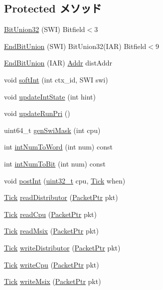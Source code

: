 \subsection*{Protected メソッド}
\begin{DoxyCompactItemize}
\item 
\hyperlink{classPl390_aa9b0863223c08e95ba11ad9fce05f3fe}{BitUnion32} (SWI) Bitfield$<$3
\item 
\hyperlink{classPl390_a094c748f681520d1c676cc22f9542515}{EndBitUnion} (SWI) BitUnion32(IAR) Bitfield$<$9
\item 
\hyperlink{classPl390_af3e922c98e5df31ce49f179286cf9d48}{EndBitUnion} (IAR) \hyperlink{base_2types_8hh_af1bb03d6a4ee096394a6749f0a169232}{Addr} distAddr
\item 
void \hyperlink{classPl390_a682f28e23fc12360ec124caecc0247dd}{softInt} (int ctx\_\-id, SWI swi)
\item 
void \hyperlink{classPl390_affe49b35938d140039c9e4f8aac94409}{updateIntState} (int hint)
\item 
void \hyperlink{classPl390_a036668b76c53cab82ed983b838667b23}{updateRunPri} ()
\item 
uint64\_\-t \hyperlink{classPl390_a049810caa3741b4b2735ef8b793d4715}{genSwiMask} (int cpu)
\item 
int \hyperlink{classPl390_a297a4fe16fb79c127baa3558efb81261}{intNumToWord} (int num) const 
\item 
int \hyperlink{classPl390_a3ea7cede01d4b5413a1f54d9375d9c82}{intNumToBit} (int num) const 
\item 
void \hyperlink{classPl390_a3c861ed28942d7d4b1f556c221da9e0f}{postInt} (\hyperlink{Type_8hh_a435d1572bf3f880d55459d9805097f62}{uint32\_\-t} cpu, \hyperlink{base_2types_8hh_a5c8ed81b7d238c9083e1037ba6d61643}{Tick} when)
\item 
\hyperlink{base_2types_8hh_a5c8ed81b7d238c9083e1037ba6d61643}{Tick} \hyperlink{classPl390_a4eccad5b19d64abe6178573f999b2b3b}{readDistributor} (\hyperlink{classPacket}{PacketPtr} pkt)
\item 
\hyperlink{base_2types_8hh_a5c8ed81b7d238c9083e1037ba6d61643}{Tick} \hyperlink{classPl390_a84ba155f907b634fa25ff18617946445}{readCpu} (\hyperlink{classPacket}{PacketPtr} pkt)
\item 
\hyperlink{base_2types_8hh_a5c8ed81b7d238c9083e1037ba6d61643}{Tick} \hyperlink{classPl390_a1142f717b26e0ca228aa41f04a8c9b9c}{readMsix} (\hyperlink{classPacket}{PacketPtr} pkt)
\item 
\hyperlink{base_2types_8hh_a5c8ed81b7d238c9083e1037ba6d61643}{Tick} \hyperlink{classPl390_aa2bced1a2b305cd5aa2e0f9fed1e1e2b}{writeDistributor} (\hyperlink{classPacket}{PacketPtr} pkt)
\item 
\hyperlink{base_2types_8hh_a5c8ed81b7d238c9083e1037ba6d61643}{Tick} \hyperlink{classPl390_a1a1ae570cfae6908672073193a14ef6a}{writeCpu} (\hyperlink{classPacket}{PacketPtr} pkt)
\item 
\hyperlink{base_2types_8hh_a5c8ed81b7d238c9083e1037ba6d61643}{Tick} \hyperlink{classPl390_a5842952b3d66843d825fc907816c9647}{writeMsix} (\hyperlink{classPacket}{PacketPtr} pkt)
\end{DoxyCompactItemize}
